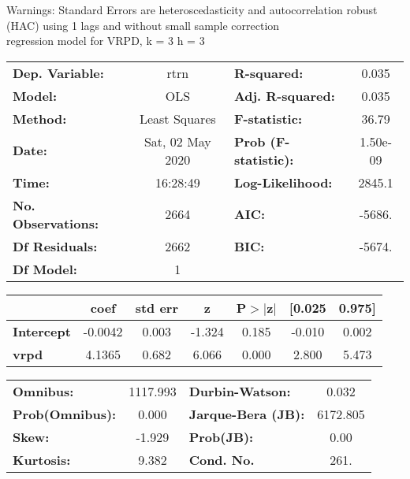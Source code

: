 Warnings: \newline
 [1] Standard Errors are heteroscedasticity and autocorrelation robust (HAC) using 1 lags and without small sample correction\\ 

regression model for VRPD, k = 3 h = 3\begin{center}
\begin{tabular}{lclc}
\toprule
\textbf{Dep. Variable:}    &       rtrn       & \textbf{  R-squared:         } &     0.035   \\
\textbf{Model:}            &       OLS        & \textbf{  Adj. R-squared:    } &     0.035   \\
\textbf{Method:}           &  Least Squares   & \textbf{  F-statistic:       } &     36.79   \\
\textbf{Date:}             & Sat, 02 May 2020 & \textbf{  Prob (F-statistic):} &  1.50e-09   \\
\textbf{Time:}             &     16:28:49     & \textbf{  Log-Likelihood:    } &    2845.1   \\
\textbf{No. Observations:} &        2664      & \textbf{  AIC:               } &    -5686.   \\
\textbf{Df Residuals:}     &        2662      & \textbf{  BIC:               } &    -5674.   \\
\textbf{Df Model:}         &           1      & \textbf{                     } &             \\
\bottomrule
\end{tabular}
\begin{tabular}{lcccccc}
                   & \textbf{coef} & \textbf{std err} & \textbf{z} & \textbf{P$> |$z$|$} & \textbf{[0.025} & \textbf{0.975]}  \\
\midrule
\textbf{Intercept} &      -0.0042  &        0.003     &    -1.324  &         0.185        &       -0.010    &        0.002     \\
\textbf{vrpd}      &       4.1365  &        0.682     &     6.066  &         0.000        &        2.800    &        5.473     \\
\bottomrule
\end{tabular}
\begin{tabular}{lclc}
\textbf{Omnibus:}       & 1117.993 & \textbf{  Durbin-Watson:     } &    0.032  \\
\textbf{Prob(Omnibus):} &   0.000  & \textbf{  Jarque-Bera (JB):  } & 6172.805  \\
\textbf{Skew:}          &  -1.929  & \textbf{  Prob(JB):          } &     0.00  \\
\textbf{Kurtosis:}      &   9.382  & \textbf{  Cond. No.          } &     261.  \\
\bottomrule
\end{tabular}
\end{center}


